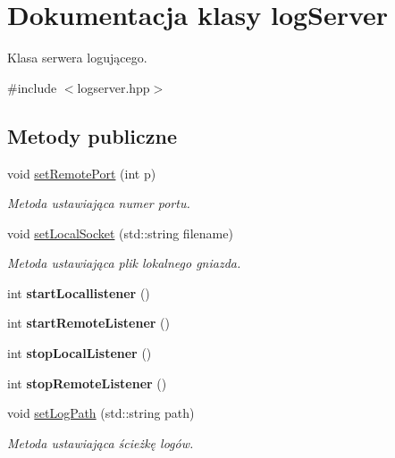 \hypertarget{classlog_server}{}\section{Dokumentacja klasy log\+Server}
\label{classlog_server}


Klasa serwera logującego.  




{\ttfamily \#include $<$logserver.\+hpp$>$}

\subsection*{Metody publiczne}
\begin{DoxyCompactItemize}
\item 
void \hyperlink{classlog_server_acc990124cb133cbcad5f9ce8bce04bac}{set\+Remote\+Port} (int p)
\begin{DoxyCompactList}\small\item\em Metoda ustawiająca numer portu. \end{DoxyCompactList}\item 
void \hyperlink{classlog_server_afbafe39a17024928f9b807e01ab5d592}{set\+Local\+Socket} (std\+::string filename)
\begin{DoxyCompactList}\small\item\em Metoda ustawiająca plik lokalnego gniazda. \end{DoxyCompactList}\item 
\mbox{\label{classlog_server_a207f02697f660fd3b6af3119fb0779b4}} 
int {\bfseries start\+Locallistener} ()
\item 
\mbox{\label{classlog_server_ae9c4341258cae8ed4608e0425b11b013}} 
int {\bfseries start\+Remote\+Listener} ()
\item 
\mbox{\label{classlog_server_a97c4118b567cdcd78eec882fbaf4cd9f}} 
int {\bfseries stop\+Local\+Listener} ()
\item 
\mbox{\label{classlog_server_aad3fc8d8b224eee734af1c9bbd8fc6f1}} 
int {\bfseries stop\+Remote\+Listener} ()
\item 
void \hyperlink{classlog_server_ac5dfb2bbf7b156d05b07502081abc573}{set\+Log\+Path} (std\+::string path)
\begin{DoxyCompactList}\small\item\em Metoda ustawiająca ścieżkę logów. \end{DoxyCompactList}\item 

\end{DoxyCompactItemize}
